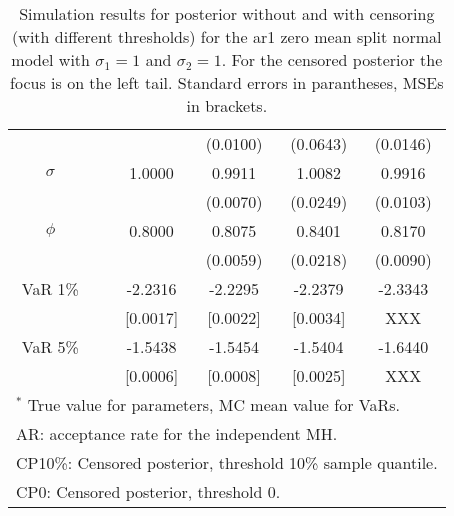 {\begin{table}
\begin{tabular}{cc cccc}
&&   & (0.0100) & (0.0643) & (0.0146)  \\ 
$\sigma$&& 1.0000 & 0.9911 & 1.0082 & 0.9916  \\ 
&&   & (0.0070) & (0.0249) & (0.0103)  \\ 
$\phi$&& 0.8000 & 0.8075 & 0.8401 & 0.8170  \\ 
&&   & (0.0059) & (0.0218) & (0.0090)  \\ 
VaR 1\% && -2.2316 & -2.2295 & -2.2379 & -2.3343  \\ 
  && [0.0017] & [0.0022] & [0.0034] &  XXX  \\ 
VaR 5\% && -1.5438 & -1.5454 & -1.5404 & -1.6440  \\ 
 && [0.0006] & [0.0008] & [0.0025] &  XXX  \\ 
\hline 
\multicolumn{6}{l}{\footnotesize{$^*$ True value for parameters, MC mean value for VaRs.}}  \\ 
\multicolumn{6}{l}{\footnotesize{AR: acceptance rate for the independent MH.}}  \\ 
\multicolumn{6}{l}{\footnotesize{CP10\%: Censored posterior, threshold 10\% sample quantile.}}  \\ 
\multicolumn{6}{l}{\footnotesize{CP0: Censored posterior, threshold 0.}} 
\end{tabular}
 \caption{Simulation results for posterior without and with censoring (with different thresholds) for the ar1 zero mean split normal model with $\sigma_{1} = 1$ and $\sigma_{2} = 1$. For the censored posterior the focus is on the left tail. Standard errors in parantheses, MSEs in brackets.} 
\label{tab:ar1}  
\end{table}
}